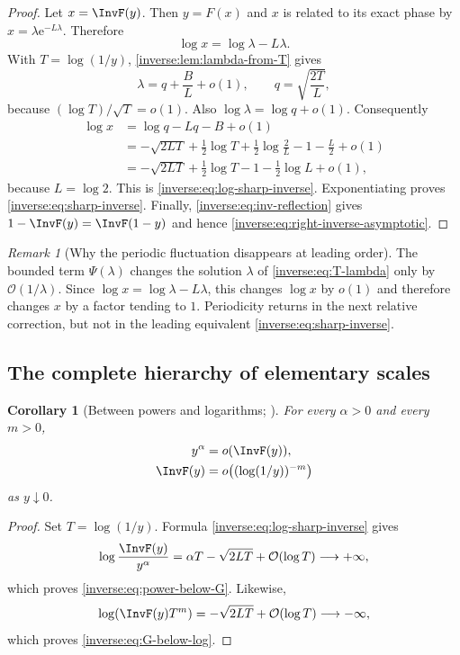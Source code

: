 \documentclass[11pt,oneside]{article}
\newtheorem{corollary}[corollary]{Corollary}
\theoremstyle{definition}
\theoremstyle{remark}
\newtheorem{remark}[remark]{Remark}
\newcommand{\e}{\mathrm e}
\newcommand{\bigO}{\mathcal O}
\begin{document}
\begin{proof}
Let $x=\InvF(y)$.  Then $y=F(x)$ and $x$ is related to its exact phase by
$x=\lambda\e^{-L\lambda}$.  Therefore
\[
 \log x=\log\lambda-L\lambda.
\]
With $T=\log(1/y)$, \cref{inverse:lem:lambda-from-T} gives
\[
 \lambda=q+\frac BL+o(1),\qquad
 q=\sqrt{\frac{2T}{L}},
\]
because $(\log T)/\sqrt T=o(1)$.  Also $\log\lambda=\log q+o(1)$.
Consequently
\begin{align*}
 \log x
 &=\log q-Lq-B+o(1)\\
 &=-\sqrt{2LT}
   +\frac12\log T+\frac12\log\frac2L
   -1-\frac L2+o(1)\\
 &=-\sqrt{2LT}
   +\frac12\log T-1-\frac12\log L+o(1),
\end{align*}
because $L=\log2$.  This is \eqref{inverse:eq:log-sharp-inverse}.
Exponentiating proves \eqref{inverse:eq:sharp-inverse}.  Finally,
\eqref{inverse:eq:inv-reflection} gives
$1-\InvF(y)=\InvF(1-y)$ and hence
\eqref{inverse:eq:right-inverse-asymptotic}.
\end{proof}

\begin{remark}[Why the periodic fluctuation disappears at leading order]
The bounded term $\Psi(\lambda)$ changes the solution $\lambda$ of
\eqref{inverse:eq:T-lambda} only by $\bigO(1/\lambda)$.  Since
$\log x=\log\lambda-L\lambda$, this changes $\log x$ by $o(1)$ and
therefore changes $x$ by a factor tending to $1$.  Periodicity returns in
the next relative correction, but not in the leading equivalent
\eqref{inverse:eq:sharp-inverse}.
\end{remark}

\subsection{The complete hierarchy of elementary scales}

\begin{corollary}[Between powers and logarithms; \Derived]
\label{inverse:cor:inverse-scale-hierarchy}
For every $\alpha>0$ and every $m>0$,
\begin{align}
 y^\alpha&=o(\InvF(y)), \label{inverse:eq:power-below-G}\\
 \InvF(y)&=o\!\left((\log(1/y))^{-m}\right)
 \label{inverse:eq:G-below-log}
\end{align}
as $y\downarrow0$.
\end{corollary}

\begin{proof}
Set $T=\log(1/y)$.  Formula \eqref{inverse:eq:log-sharp-inverse} gives
\[
 \log\frac{\InvF(y)}{y^\alpha}
 =\alpha T-\sqrt{2LT}+\bigO(\log T)\longrightarrow+\infty,
\]
which proves \eqref{inverse:eq:power-below-G}.  Likewise,
\[
 \log\!\left(\InvF(y)T^m\right)
 =-\sqrt{2LT}+\bigO(\log T)\longrightarrow-\infty,
\]
which proves \eqref{inverse:eq:G-below-log}.
\end{proof}
\end{document}
